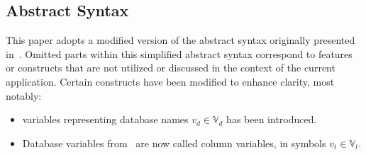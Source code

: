\subsection{Abstract Syntax} \label{subsec:function-definitions}

This paper adopts a modified version of the abstract syntax originally presented in~\cite{cortesi_abstract_2013}.
Omitted parts within this simplified abstract syntax correspond to features or constructs that are not utilized or discussed in the context of the current application.
Certain constructs have been modified to enhance clarity, most notably:
\begin{itemize}
    \item variables representing database names $v_d \in \mathbb{V}_d$ has been introduced.
    \item Database variables from~\cite{halder_abstract_2012} are now called column variables, in symbols $v_t \in \mathbb{V}_t$.
\end{itemize}

